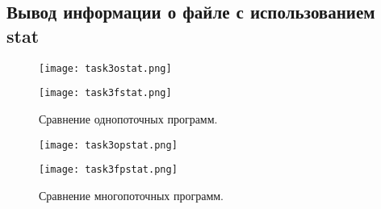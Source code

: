\clearpage

\subsection{Вывод информации о файле с использованием stat}

\begin{figure}[h]
    \centering
    \hspace*{\fill}
    \begin{minipage}{0.392\textwidth}
        \centering
        \texttt{[image: task3ostat.png]}
    \end{minipage}
    \hfill
    \begin{minipage}{0.376\textwidth}
        \centering
        \texttt{[image: task3fstat.png]}
    \end{minipage}
    \hspace*{\fill}
    \caption{Сравнение однопоточных программ.}
\end{figure}

\begin{figure}[h]
    \centering
    \hspace*{\fill}
    \begin{minipage}{0.384\textwidth}
        \centering
        \texttt{[image: task3opstat.png]}
    \end{minipage}
    \hfill
    \begin{minipage}{0.392\textwidth}
        \centering
        \texttt{[image: task3fpstat.png]}
    \end{minipage}
    \hspace*{\fill}
    \caption{Сравнение многопоточных программ.}
\end{figure}

